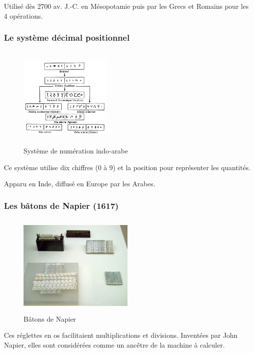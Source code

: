 \documentclass[11pt]{article}
\begin{document}
Utilisé dès 2700 av. J.-C. en Mésopotamie puis par les Grecs et
Romains pour les 4 opérations.




\subsubsection{Le système décimal positionnel}
\label{sec:org74ff252}

\begin{figure}[htbp]
\centering
\includegraphics[width=0.4\textwidth,height=5cm]{./images/Numeration.png}
\caption{Système de numération indo-arabe}
\end{figure}


Ce système utilise dix chiffres (0 à 9) et la position pour
représenter les quantités.

Apparu en Inde, diffusé en Europe par les Arabes.



\subsubsection{Les bâtons de Napier (1617)}
\label{sec:orgff7acd3}

\begin{figure}[htbp]
\centering
\includegraphics[width=0.5\textwidth,height=5cm]{./images/batons-napier.jpg}
\caption{Bâtons de Napier}
\end{figure}


Ces réglettes en os facilitaient multiplications et
divisions. Inventées par John Napier, elles sont considérées comme un
ancêtre de la machine à calculer.
\end{document}
